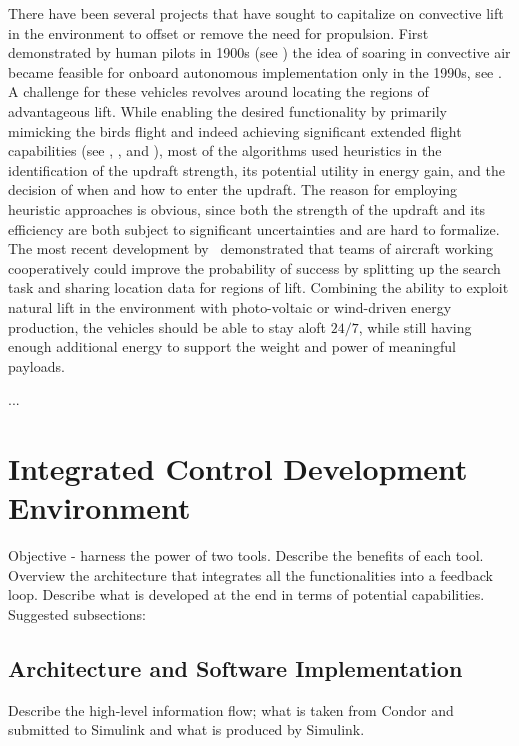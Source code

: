 \documentclass[letterpaper, 10 pt, conference]{ieeeconf}  %
\begin{document}
There have been several projects that have sought to capitalize on convective 
lift in the environment to offset or remove the need for propulsion. First 
demonstrated by human pilots in 1900s (see \cite{Simons:1998}) the idea of 
soaring in convective air became feasible for onboard autonomous 
implementation only in the 1990s, see \cite{Wharington:1998}. A challenge for 
these vehicles revolves around locating the regions of advantageous lift. 
While enabling the desired functionality by primarily mimicking the birds 
flight and indeed achieving significant extended flight capabilities (see 
\cite{Edwards:2008}, \cite{Allen:2006}, and \cite{Allen:2007}), most of the 
algorithms used heuristics in the identification of the updraft strength, its 
potential utility in energy gain, and the decision of when and how to enter 
the updraft. The reason for employing heuristic approaches is obvious, since 
both the strength of the updraft and its efficiency are both subject to 
significant uncertainties and are hard to formalize. The most recent 
development by~\cite{AKlass_CDC:2012,AKlass_JGCD:2012} demonstrated that 
teams of aircraft working cooperatively could improve the probability of 
success by splitting up the search task and sharing location data for regions 
of lift. Combining the ability to exploit natural lift in the environment 
with photo-voltaic or wind-driven energy production, the vehicles should be 
able to stay aloft $24/7$, while still having enough additional energy to 
support the weight and power of meaningful payloads.

...

\section{Integrated Control Development Environment}
Objective - harness the power of two tools. Describe the benefits of each 
tool. Overview the architecture that integrates all the functionalities into 
a feedback loop. Describe what is developed at the end in terms of potential 
capabilities. Suggested subsections:

\subsection{Architecture and Software Implementation}
Describe the high-level information flow; what is taken from Condor and 
submitted to Simulink and what is produced by Simulink.
\end{document}
